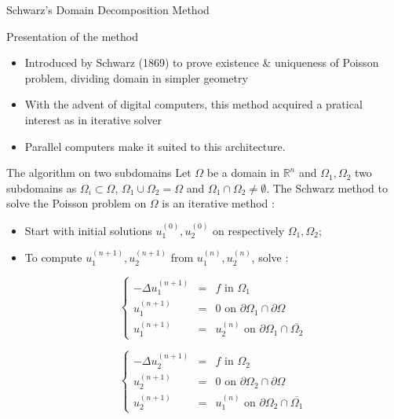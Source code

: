 \documentclass[compress,10pt,aspectratio=169]{beamer}
\begin{document}
\begin{frame}{Schwarz's Domain Decomposition Method}
  \scriptsize
  \begin{block}{\small Presentation of the method}
    \begin{itemize}
      \item Introduced by Schwarz (1869) to prove existence \& uniqueness of Poisson problem, dividing domain
            in simpler geometry
      \item With the advent of digital computers, this method acquired a pratical interest as in iterative solver
      \item Parallel computers make it suited to this architecture.
    \end{itemize}
  \end{block}

  \begin{exampleblock}{The algorithm on two subdomains}
    Let $\Omega$ be a domain in $\mathbb{R}^{n}$ and $\Omega_{1},\Omega_{2}$ two subdomains as $\Omega_{i}\subset \Omega$,
    $\Omega_{1}\cup \Omega_{2} = \Omega$ and $\Omega_{1}\cap \Omega_{2} \neq \emptyset$. The Schwarz method to solve the
    Poisson problem on $\Omega$ is an iterative method :
    \begin{itemize}
      \item Start with initial solutions $u^{(0)}_{1},u^{(0)}_{2}$ on respectively $\Omega_{1}, \Omega_{2}$;
      \item To compute $u^{(n+1)}_{1}, u^{(n+1)}_{2}$ from $u^{(n)}_{1}, u^{(n)}_{2}$, solve :
      \vspace*{-5mm}
      \begin{multicols}{2}
        \[
          \left\{
            \begin{array}{lcl}
              -\Delta u_{1}^{(n+1)} & = & f \mbox{ in }\Omega_{1}\\
              u_{1}^{(n+1)} & = & 0 \mbox{ on } \partial\Omega_{1} \cap \partial \Omega \\
              u_{1}^{(n+1)} & = & u_{2}^{(n)} \mbox{ on } \partial\Omega_{1} \cap  \overline{\Omega_{2}}
            \end{array}
          \right.
        \]

        \[
          \left\{
            \begin{array}{lcl}
              -\Delta u_{2}^{(n+1)} & = & f \mbox{ in }\Omega_{2}\\
              u_{2}^{(n+1)} & = & 0 \mbox{ on } \partial\Omega_{2} \cap \partial\Omega \\
              u_{2}^{(n+1)} & = & u_{1}^{(n)} \mbox{ on } \partial\Omega_{2} \cap \overline{\Omega_{1}}
            \end{array}
          \right.
        \]
      \end{multicols}
    \end{itemize}
  \end{exampleblock}
\end{frame}
\end{document}
